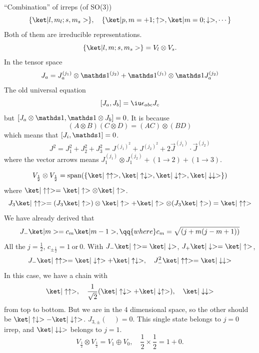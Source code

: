 ``Combination'' of irreps (of SO(3))
\[
  \{\ket|l,m_l;s,m_s>\}, \quad
  \{
    \ket|p, m = +1; \uparrow>,
    \ket|m = 0; \downarrow>, \cdots
  \}
\]
Both of them are irreducible representations.
\[
  \{\ket|l,m;s,m_s>\} = V_l \otimes V_s.
\]
In the tensor space
\[
  J_a = J_a^{(j_1)} \otimes \identity^{(j_2)}
+ \identity^{(j_1)} \otimes \identity J_a^{(j_2)}
\]
The old universal equation
\[
  [J_a, J_b] = \iu\epsilon_{abc} J_c
\]
but $[J_a\otimes\identity, \identity \otimes J_b] = 0$.
It is because
\[
  (A\otimes B) (C\otimes D) = (AC) \otimes (BD)
\]
which means that $[J_i, \identity] = 0$.
\[
  J^2 = J_1^2 + J_2^2 + J_3^2 = J^{(j_1)^2} + J^{(j_2)^2}
+ 2\vec J^{(j_1)} \cdot \vec J^{(j_2)}
\]
where the vector arrows means $J_1^{(j_1)} \otimes J_1^{(j_2)} + (1\to 2) + (1\to 3)$.
\begin{example}
  \[
    V_\frac12\otimes V_\frac12 = \operatorname{span}(
    \{\ket|\uparrow\uparrow>, \ket|\uparrow\downarrow>,
      \ket|\downarrow\uparrow>, \ket|\downarrow\downarrow>\})
  \]
  where $\ket|\uparrow\uparrow> = \ket|\uparrow> \otimes \ket|\uparrow>$.
  \[
    J_3\ket|\uparrow\uparrow>
  = (J_3\ket|\uparrow>) \otimes \ket|\uparrow>
  + \ket|\uparrow> \otimes (J_3\ket|\uparrow>) = \ket|\uparrow\uparrow>
  \]
  We have already derived that
  \[
    J_- \ket|m> = c_m\ket|m - 1>, \qq{where}
    c_m = \sqrt{(j+m(j-m+1))}
  \]
  All the $j = \frac12$, $c_{\pm\frac12} = 1\ \text{or}\ 0$.
  With $J_-\ket|\uparrow> = \ket|\downarrow>$,
  $J_+\ket|\downarrow> = \ket|\uparrow>$, 
  \[
    J_-\ket|\uparrow\uparrow>
  = \ket|\downarrow\uparrow> + \ket|\uparrow\downarrow>, \quad
    J_-^2\ket|\uparrow\uparrow>
  = \ket|\downarrow\downarrow>
  \]
  In this case, we have a chain with
  \[
    \ket|\uparrow\uparrow>, \quad
    \frac1{\sqrt2}(\ket|\uparrow\downarrow> + \ket|\downarrow\uparrow>),\quad
    \ket|\downarrow\downarrow>
  \]
  from top to bottom.
  But we are in the 4 dimensional space, so the other should be
  $\ket|\uparrow\downarrow> - \ket|\downarrow\uparrow>$.
  $J_{3,\pm}(\quad) = 0$.
  This single state belongs to $j = 0$ irrep, and
  $\ket|\downarrow\downarrow>$ belongs to $j = 1$.
  \[
    V_{\frac12} \otimes V_{\frac12} = V_1 \oplus V_0, \quad
    \frac12 \times \frac12 = 1 + 0.
  \]
\end{example}
